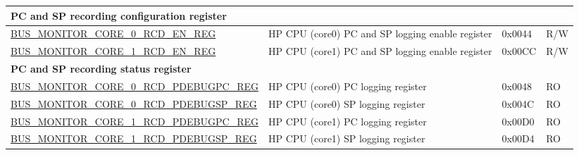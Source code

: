 \begin{longtable}{ |m{11.5cm}| p{8cm}| l | l | }
\multicolumn{4}{|l|}{\textbf{PC and SP recording configuration register}} \\ \hline
\hyperref[regdesc:BUSMONITORCORE0RCDENREG]{BUS\_MONITOR\_CORE\_0\_RCD\_EN\_REG} & HP CPU (core0) PC and SP logging enable register & 0x0044 & R/W \\ \hline
\hyperref[regdesc:BUSMONITORCORE1RCDENREG]{BUS\_MONITOR\_CORE\_1\_RCD\_EN\_REG} & HP CPU (core1) PC and SP logging enable register & 0x00CC & R/W \\ \hline
\multicolumn{4}{|l|}{\textbf{PC and SP recording status register}} \\ \hline
\hyperref[regdesc:BUSMONITORCORE0RCDPDEBUGPCREG]{BUS\_MONITOR\_CORE\_0\_RCD\_PDEBUGPC\_REG} & HP CPU (core0) PC logging register & 0x0048 & RO \\ \hline
\hyperref[regdesc:BUSMONITORCORE0RCDPDEBUGSPREG]{BUS\_MONITOR\_CORE\_0\_RCD\_PDEBUGSP\_REG} & HP CPU (core0) SP logging register & 0x004C & RO \\ \hline
\hyperref[regdesc:BUSMONITORCORE1RCDPDEBUGPCREG]{BUS\_MONITOR\_CORE\_1\_RCD\_PDEBUGPC\_REG} & HP CPU (core1) PC logging register & 0x00D0 & RO \\ \hline
\hyperref[regdesc:BUSMONITORCORE1RCDPDEBUGSPREG]{BUS\_MONITOR\_CORE\_1\_RCD\_PDEBUGSP\_REG} & HP CPU (core1) SP logging register & 0x00D4 & RO \\ \hline


\end{longtable}
